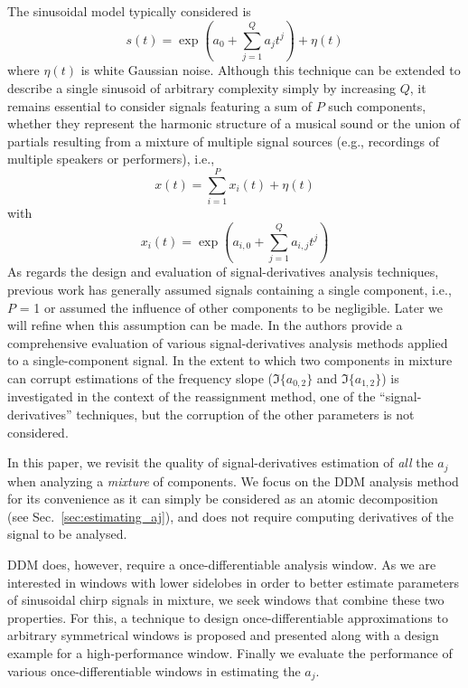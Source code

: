 \documentclass[twoside,a4paper]{article}
\begin{document}
The sinusoidal model typically considered is
%
\begin{equation}
    \label{eq:polyphaseexp}
    s(t) = \exp(a_0 + \sum_{j=1}^{Q} a_j t^j) + \eta(t)
\end{equation}
where $\eta(t)$ is white Gaussian noise.
%
Although this technique can be extended to describe a single sinusoid of
arbitrary complexity simply by increasing $Q$, it remains essential to consider
signals featuring a sum of $P$ such components, whether they represent the harmonic structure of a musical sound or the union of partials resulting from a mixture of multiple signal sources (e.g., recordings of multiple speakers or performers),  i.e., 
%
\begin{equation}
    \label{eq:polyphaseexpmix}
    x(t) = \sum_{i=1}^{P} x_{i}(t) + \eta(t)
\end{equation}
%
with
%
\[
    x_{i}(t) = \exp(a_{i,0} + \sum_{j=1}^{Q} a_{i,j} t^j)
\]
%
As regards the design and evaluation of signal-derivatives analysis techniques,
previous work has generally assumed signals containing a single component, i.e.,
$P$ = 1 or assumed the influence of other components to be negligible. Later we
will refine when this assumption can be made. In \cite{hamilton2012comparisons}
the authors provide a comprehensive evaluation of various signal-derivatives
analysis methods applied to a single-component signal. In
\cite{robel2002estimating} the extent to which two components in mixture can
corrupt estimations of the frequency slope ($\Im\{a_{0,2}\}$ and
$\Im\{a_{1,2}\}$) is investigated in the context of the reassignment method, one
of the ``signal-derivatives'' techniques, but the corruption of the other
parameters is not considered.

In this paper, we revisit the quality of signal-derivatives estimation of
\textit{all} the $a_{j}$ when analyzing a \textit{mixture} of components. We focus on
the DDM \cite{betser2009sinusoidal} analysis method for its convenience as it
can simply be considered as an atomic decomposition (see
Sec.~\ref{sec:estimating_aj}), and does not require computing derivatives
of the signal to be analysed.

DDM does, however, require a once-differentiable analysis window. As we are
interested in windows with lower sidelobes in order to better estimate
parameters of sinusoidal chirp signals in mixture, we seek windows that
combine these two properties. For this, a technique to design
once-differentiable approximations to arbitrary symmetrical windows is proposed
and presented along with a design example for a high-performance window. Finally
we evaluate the performance of various once-differentiable windows in estimating
the $a_{j}$.
\end{document}
